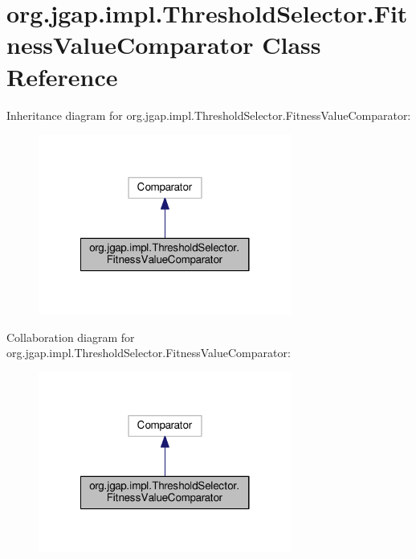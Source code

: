 \hypertarget{classorg_1_1jgap_1_1impl_1_1_threshold_selector_1_1_fitness_value_comparator}{\section{org.\-jgap.\-impl.\-Threshold\-Selector.\-Fitness\-Value\-Comparator Class Reference}
\label{classorg_1_1jgap_1_1impl_1_1_threshold_selector_1_1_fitness_value_comparator}
}


Inheritance diagram for org.\-jgap.\-impl.\-Threshold\-Selector.\-Fitness\-Value\-Comparator\-:
\nopagebreak
\begin{figure}[H]
\begin{center}
\leavevmode
\includegraphics[width=236pt]{classorg_1_1jgap_1_1impl_1_1_threshold_selector_1_1_fitness_value_comparator__inherit__graph}
\end{center}
\end{figure}


Collaboration diagram for org.\-jgap.\-impl.\-Threshold\-Selector.\-Fitness\-Value\-Comparator\-:
\nopagebreak
\begin{figure}[H]
\begin{center}
\leavevmode
\includegraphics[width=236pt]{classorg_1_1jgap_1_1impl_1_1_threshold_selector_1_1_fitness_value_comparator__coll__graph}
\end{center}
\end{figure}

